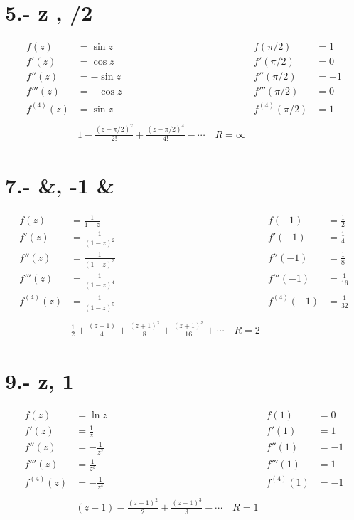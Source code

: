 \documentclass{article}
\begin{document}
\section*{5.- \sin z , \pi/2 }
\begin{align*}
f(z) &= \sin z & f(\pi/2) &= 1 \\
f'(z) &= \cos z & f'(\pi/2) &= 0 \\
f''(z) &= -\sin z & f''(\pi/2) &= -1 \\
f'''(z) &= -\cos z & f'''(\pi/2) &= 0 \\
f^{(4)}(z) &= \sin z & f^{(4)}(\pi/2) &= 1 \\
\\
& 1 - \frac{(z - \pi/2)^2}{2!} + \frac{(z - \pi/2)^4}{4!} - \dotsb \quad R = \infty 
\end{align*}
\section*{7.- &\cdot {}, -1 & \\ }
\begin{align*}
f(z) &= \frac{1}{1-z} & f(-1) &= \frac{1}{2} \\
f'(z) &= \frac{1}{(1-z)^2} & f'(-1) &= \frac{1}{4} \\
f''(z) &= \frac{1}{(1-z)^3} & f''(-1) &= \frac{1}{8} \\
f'''(z) &= \frac{1}{(1-z)^4} & f'''(-1) &= \frac{1}{16} \\
f^{(4)}(z) &= \frac{1}{(1-z)^5} & f^{(4)}(-1) &= \frac{1}{32} \\
\\
& \frac{1}{2} + \frac{(z+1)}{4} + \frac{(z+1)^2}{8} + \frac{(z+1)^3}{16} + \dotsb \quad R = 2
\end{align*}
\section*{9.- \ln z, 1 }
\begin{align*}
f(z) &= \ln z & f(1) &= 0 \\
f'(z) &= \frac{1}{z} & f'(1) &= 1 \\
f''(z) &= -\frac{1}{z^2} & f''(1) &= -1 \\
f'''(z) &= \frac{1}{z^3} & f'''(1) &= 1 \\
f^{(4)}(z) &= -\frac{1}{z^4} & f^{(4)}(1) &= -1 \\
\\
& (z-1) - \frac{(z-1)^2}{2} + \frac{(z-1)^3}{3} - \dotsb \quad R = 1
\end{align*}
\end{document}
